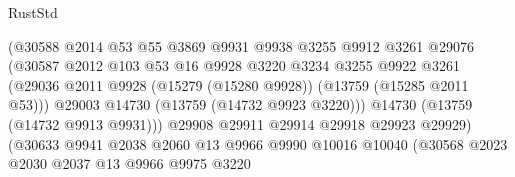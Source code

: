 \begin{lexlean}{RustStd}
\begin{coremodule}
                                      (@30588
                                        @2014
                                        @53
                                        @55
                                        @3869
                                        @9931
                                        @9938
                                        @3255
                                        @9912
                                        @3261
                                        @29076
                                        (@30587
                                          @2012
                                          @103
                                          @53
                                          @16
                                          @9928
                                          @3220
                                          @3234
                                          @3255
                                          @9922
                                          @3261
                                          (@29036
                                            @2011
                                            @9928
                                            (@15279 (@15280 @9928))
                                            (@13759 (@15285 @2011 @53)))
                                          @29003
                                          @14730
                                          (@13759 (@14732 @9923 @3220)))
                                        @14730
                                        (@13759 (@14732 @9913 @9931)))
                                      @29908
                                      @29911
                                      @29914
                                      @29918
                                      @29923
                                      @29929)
                                    (@30633
                                      @9941
                                      @2038
                                      @2060
                                      @13
                                      @9966
                                      @9990
                                      @10016
                                      @10040
                                      (@30568
                                        @2023
                                        @2030
                                        @2037
                                        @13
                                        @9966
                                        @9975
                                        @3220

\end{coremodule}
\end{lexlean}
